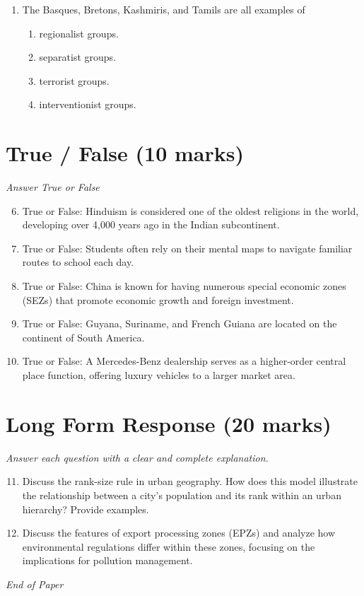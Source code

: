 \documentclass[12pt]{article}
\begin{document}
\begin{enumerate}[label=\arabic*.]
\begin{enumerate}[label=(\alph*)]
    \item new residents live peacefully with old residents.
    \item new residents assimilate with old residents completely.
    \item new residents move into areas occupied by older resident groups.
\end{enumerate}
\item The Basques, Bretons, Kashmiris, and Tamils are all examples of
\begin{enumerate}[label=(\alph*)]
    \item regionalist groups.
    \item separatist groups.
    \item terrorist groups.
    \item interventionist groups.
\end{enumerate}
\end{enumerate}

\section*{True / False (10 marks)}
\textit{Answer True or False}
\begin{enumerate}[label=\arabic*.]
\setcounter{enumi}{5}
\item True or False: Hinduism is considered one of the oldest religions in the world, developing over 4,000 years ago in the Indian subcontinent.
\item True or False: Students often rely on their mental maps to navigate familiar routes to school each day.
\item True or False: China is known for having numerous special economic zones (SEZs) that promote economic growth and foreign investment.
\item True or False: Guyana, Suriname, and French Guiana are located on the continent of South America.
\item True or False: A Mercedes-Benz dealership serves as a higher-order central place function, offering luxury vehicles to a larger market area.
\end{enumerate}

\section*{Long Form Response (20 marks)}
\textit{Answer each question with a clear and complete explanation.}
\begin{enumerate}[label=\arabic*.]
\setcounter{enumi}{10}
\item Discuss the rank-size rule in urban geography. How does this model illustrate the relationship between a city's population and its rank within an urban hierarchy? Provide examples.
\item Discuss the features of export processing zones (EPZs) and analyze how environmental regulations differ within these zones, focusing on the implications for pollution management.
\end{enumerate}

\vfill
\noindent\textit{End of Paper}
\end{document}
